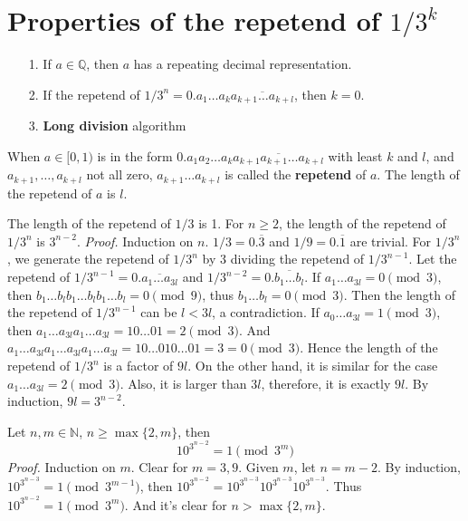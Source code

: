 \documentclass[paper=a4]{scrartcl}
\begin{document}
\section{Properties of the repetend of $1/3^k$}
\begin{tcolorbox}[arc=0pt,colback=white,title={Fact}]
\begin{itemize}
\item[1.] If $a\in\mathbb{Q}$, then $a$ has a repeating decimal representation.
\item[2.] If the repetend of $1/3^n=0.a_1\ldots a_{k}\overline{a_{k+1}\ldots a_{k+l}}$, then $k=0$.
\item[3.] \textbf{Long division} algorithm
\end{itemize}
\end{tcolorbox}
\begin{tcolorbox}[arc=0pt,colback=white,title={Definition}]
When $a\in[0,1)$ is in the form $0.a_1a_2\ldots a_{k}\overline{a_{k+1}a_{k+1}\ldots a_{k+l}}$ with least $k$ and $l$, and $a_{k+1},\ldots,a_{k+l}$ not all zero, $a_{k+1}\ldots a_{k+l}$ is called the \textbf{repetend} of $a$. The length of the repetend of $a$ is $l$.
\end{tcolorbox}
\begin{tcolorbox}[arc=0pt,colback=white,title={Property}]
The length of the repetend of $1/3$ is 1. For $n\geq 2$, the length of the repetend of $1/3^n$ is $3^{n-2}$.
\tcblower
\textit{Proof. } Induction on $n$. $1/3=0.\overline 3$ and $1/9=0.\overline 1$ are trivial. For $1/3^n$, we generate the repetend of $1/3^n$ by  3 dividing the repetend of $1/3^{n-1}$.  Let the repetend of $1/3^{n-1}=0.\overline{a_1\ldots a_{3l}}$ and $1/3^{n-2}=0.\overline{b_1\ldots b_l}$. If $a_1\ldots a_{3l}=0\pmod{3}$, then $b_1\ldots b_lb_1\ldots b_lb_1\ldots b_l=0\pmod{9}$, thus $b_1\ldots b_l=0\pmod 3$. Then the length of the repetend of $1/3^{n-1}$ can be $l<3l$, a contradiction. If $a_0\ldots a_{3l}=1\pmod 3$, then $a_1\ldots a_{3l}a_1\ldots a_{3l}=10\ldots 01=2\pmod 3$. And $a_1\ldots a_{3l}a_1\ldots a_{3l}a_1\ldots a_{3l}=10\ldots 010\ldots 01=3=0\pmod 3$. Hence the length of the repetend of $1/3^n$ is a factor of $9l$. On the other hand, it is similar for the case $a_1\ldots a_{3l}=2\pmod 3$. Also, it is larger than $3l$, therefore, it is exactly $9l$. By induction, $9l=3^{n-2}$.
\end{tcolorbox}

\begin{tcolorbox}[arc=0pt,colback=white,title={Property}]
Let $n,m\in\mathbb{N}$, $n\geq \max\{2,m\}$, then 
\[
10^{3^{n-2}}=1\pmod{3^m}
\]
\tcblower
\textit{Proof.} Induction on $m$. Clear for $m=3,9$. Given $m$, let $n=m-2$. By induction, $10^{3^{n-3}}=1\pmod{3^{m-1}}$, then $10^{3^{n-2}}=10^{3^{n-3}}10^{3^{n-3}}10^{3^{n-3}}$. Thus $10^{3^{n-2}}=1\pmod{3^m}$. And it's clear for $n>\max\{2,m\}$.
\end{tcolorbox}
\end{document}
